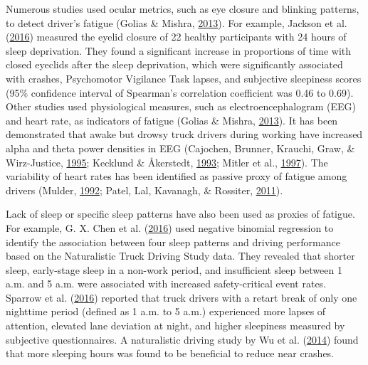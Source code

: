 \documentclass[12pt]{book}
\numberwithin{equation}{chapter}
\begin{document}
Numerous studies used ocular metrics, such as eye closure and blinking patterns, to detect driver's fatigue (Golias \& Mishra, \protect\hyperlink{ref-golias2013evaluating}{2013}). For example, Jackson et al. (\protect\hyperlink{ref-jackson2016utility}{2016}) measured the eyelid closure of 22 healthy participants with 24 hours of sleep deprivation. They found a significant increase in proportions of time with closed eyeclids after the sleep deprivation, which were significantly associated with crashes, Psychomotor Vigilance Task lapses, and subjective sleepiness scores (95\% confidence interval of Spearman's correlation coefficient was 0.46 to 0.69). Other studies used physiological measures, such as electroencephalogram (EEG) and heart rate, as indicators of fatigue (Golias \& Mishra, \protect\hyperlink{ref-golias2013evaluating}{2013}). It has been demonstrated that awake but drowsy truck drivers during working have increased alpha and theta power densities in EEG (Cajochen, Brunner, Krauchi, Graw, \& Wirz-Justice, \protect\hyperlink{ref-cajochen1995power}{1995}; Kecklund \& Åkerstedt, \protect\hyperlink{ref-kecklund1993sleepiness}{1993}; Mitler et al., \protect\hyperlink{ref-mitler1997sleep}{1997}). The variability of heart rates has been identified as passive proxy of fatigue among drivers (Mulder, \protect\hyperlink{ref-mulder1992measurement}{1992}; Patel, Lal, Kavanagh, \& Rossiter, \protect\hyperlink{ref-patel2011applying}{2011}).

Lack of sleep or specific sleep patterns have also been used as proxies of fatigue. For example, G. X. Chen et al. (\protect\hyperlink{ref-chen2016influence}{2016}) used negative binomial regression to identify the association between four sleep patterns and driving performance based on the Naturalistic Truck Driving Study data. They revealed that shorter sleep, early-stage sleep in a non-work period, and insufficient sleep between 1 a.m. and 5 a.m. were associated with increased safety-critical event rates. Sparrow et al. (\protect\hyperlink{ref-sparrow2016naturalistic}{2016}) reported that truck drivers with a retart break of only one nighttime period (defined as 1 a.m. to 5 a.m.) experienced more lapses of attention, elevated lane deviation at night, and higher sleepiness measured by subjective questionnaires. A naturalistic driving study by Wu et al. (\protect\hyperlink{ref-wu2014using}{2014}) found that more sleeping hours was found to be beneficial to reduce near crashes.
\end{document}
